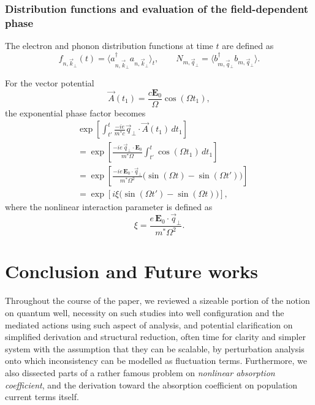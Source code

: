 \documentclass[%
 reprint,
 amsmath,amssymb,
 aps,
]{revtex4-2}
\begin{document}
\subsubsection{Distribution functions and evaluation of the field-dependent phase}

The electron and phonon distribution functions at time $t$ are defined as
\begin{equation}
f_{n,\vec{k}_{\perp}}(t)
=
\langle
a_{n,\vec{k}_{\perp}}^{\dagger}
a_{n,\vec{k}_{\perp}}
\rangle_{t},
\qquad
N_{m,\vec{q}_{\perp}}
=
\langle
b_{m,\vec{q}_{\perp}}^{\dagger}
b_{m,\vec{q}_{\perp}}
\rangle.
\end{equation}

For the vector potential
\begin{equation}
\vec{A}(t_{1})
=
\frac{c\mathbf{E}_{0}}{\Omega}
\cos(\Omega t_{1}),
\end{equation}
the exponential phase factor becomes
\begin{equation}
\begin{aligned}
&\exp\left[
\int_{t'}^{t}
\frac{-ie}{m^{*}c}
\vec{q}_{\perp}
\cdot
\vec{A}(t_{1})
\, dt_{1}
\right]\\
&=
\exp\left[
\frac{-ie\,\vec{q}_{\perp}\cdot\mathbf{E}_{0}}
{m^{*}\Omega}
\int_{t'}^{t}
\cos(\Omega t_{1})
\, dt_{1}
\right]
\\
&=
\exp\left[
\frac{-ie\,\mathbf{E}_{0}\cdot\vec{q}_{\perp}}
{m^{*}\Omega^{2}}
\big(
\sin(\Omega t)
-
\sin(\Omega t')
\big)
\right]
\\
&=
\exp\left[
i\xi
\big(
\sin(\Omega t')
-
\sin(\Omega t)
\big)
\right],
\end{aligned}
\end{equation}
where the nonlinear interaction parameter is defined as
\begin{equation}
\xi
=
\frac{e\,\mathbf{E}_{0}\cdot\vec{q}_{\perp}}
{m^{*}\Omega^{2}}.
\end{equation}
\section{Conclusion and Future works}
Throughout the course of the paper, we reviewed a sizeable portion of the notion on quantum well, necessity on such studies into well configuration and the mediated actions using such aspect of analysis, and potential clarification on simplified derivation and structural reduction, often time for clarity and simpler system with the assumption that they can be scalable, by perturbation analysis onto which inconsistency can be modelled as fluctuation terms. Furthermore, we also dissected parts of a rather famous problem on \textit{nonlinear absorption coefficient}, and the derivation toward the absorption coefficient on population current terms itself. 
\end{document}
